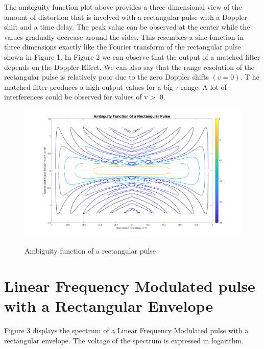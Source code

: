 \noindent The ambiguity function plot above provides a three dimensional view of the amount of distortion that is involved with a rectangular pulse with a Doppler shift and a time delay. The peak value can be observed at the center while the values gradually decrease around the sides. This resembles a sinc function in three dimensions exactly like the Fourier transform of the rectangular pulse shown in Figure 1. In Figure 2 we can observe that the output of a matched filter depends on the Doppler Effect. We can also say that the range resolution of the rectangular pulse is relatively poor due to the zero Doppler shifts $(v = 0).$ T he matched filter produces a high output values for a big $\tau$ range. A lot of interferences could be observed for values of v$>$ 0.

\begin{figure}[H]
\centering
{\includegraphics[scale=0.18]{usp8_4.png}}
\caption{ Ambiguity function of a rectangular pulse }
\end{figure}

\newpage
\section*{ Linear Frequency Modulated pulse with a Rectangular Envelope }

\noindent  Figure 3 displays the spectrum of a Linear Frequency Modulated pulse with a rectangular envelope. The voltage of the spectrum is expressed in logarithm.

